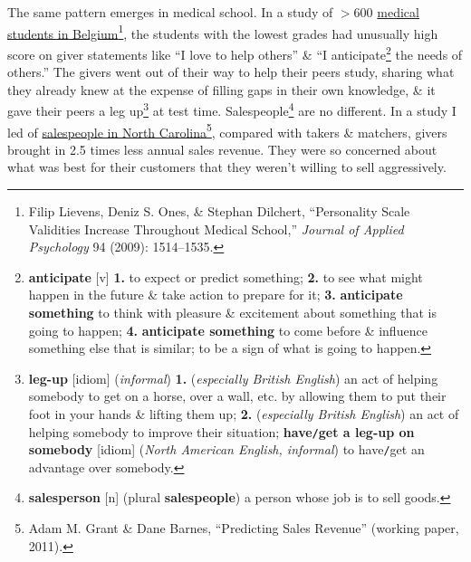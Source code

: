 \documentclass[oneside]{book}
\numberwithin{equation}{section}
\begin{document}
The same pattern emerges in medical school. In a study of $> 600$ \underline{medical students in Belgium}\footnote{Filip Lievens, Deniz S. Ones, \& Stephan Dilchert, ``Personality Scale Validities Increase Throughout Medical School,'' \textit{Journal of Applied Psychology} 94 (2009): 1514--1535.}, the students with the lowest grades had unusually high score on giver statements like ``I love to help others'' \& ``I anticipate\footnote{\textbf{anticipate} [v] \textbf{1.} to expect or predict something; \textbf{2.} to see what might happen in the future \& take action to prepare for it; \textbf{3.} \textbf{anticipate something} to think with pleasure \& excitement about something that is going to happen; \textbf{4.} \textbf{anticipate something} to come before \& influence something else that is similar; to be a sign of what is going to happen.} the needs of others.'' The givers went out of their way to help their peers study, sharing what they already knew at the expense of filling gaps in their own knowledge, \& it gave their peers a leg up\footnote{\textbf{leg-up} [idiom] (\textit{informal}) \textbf{1.} (\textit{especially British English}) an act of helping somebody to get on a horse, over a wall, etc. by allowing them to put their foot in your hands \& lifting them up; \textbf{2.} (\textit{especially British English}) an act of helping somebody to improve their situation; \textbf{have\texttt{/}get a leg-up on somebody} [idiom] (\textit{North American English, informal}) to have\texttt{/}get an advantage over somebody.} at test time. Salespeople\footnote{\textbf{salesperson} [n] (plural \textbf{salespeople}) a person whose job is to sell goods.} are no different. In a study I led of \underline{salespeople in North Carolina}\footnote{Adam M. Grant \& Dane Barnes, ``Predicting Sales Revenue'' (working paper, 2011).}, compared with takers \& matchers, givers brought in 2.5 times less annual sales revenue. They were so concerned about what was best for their customers that they weren't willing to sell aggressively.
\end{document}
